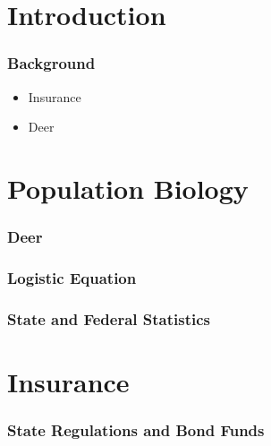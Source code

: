 


\section{Introduction}

\begin{frame}
    \frametitle{Background}
	\begin{itemize}
		\item Insurance
		\item Deer
	\end{itemize}

\end{frame}







\section{Population Biology}

\begin{frame}
    \frametitle{Deer}
\end{frame}

\begin{frame}
    \frametitle{Logistic Equation}
\end{frame}

\begin{frame}
    \frametitle{State and Federal Statistics}
\end{frame}






\section{Insurance}

\begin{frame}
    \frametitle{State Regulations and Bond Funds}
\end{frame}



